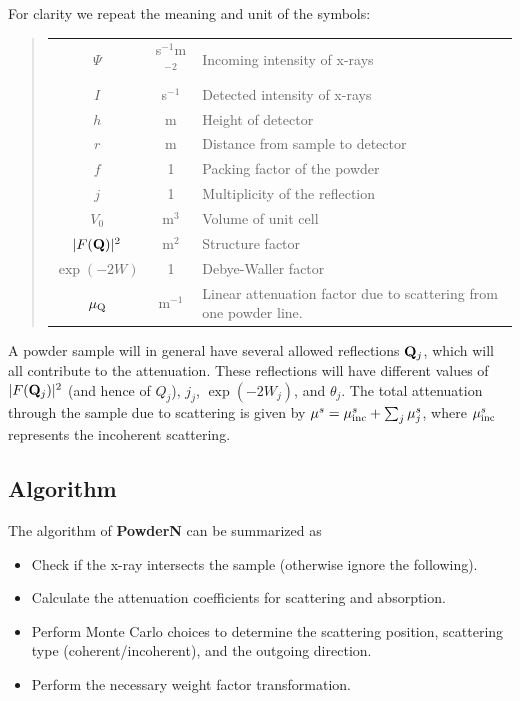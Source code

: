 For clarity we repeat the meaning and unit of the symbols:
%
\begin{quote}\begin{tabular}{ccl}
$\Psi$ & s$^{-1}$m$^{-2}$ & Incoming intensity of x-rays \\
$I$    & s$^{-1}$ & Detected intensity of x-rays \\
$h$    & m        & Height of detector \\
$r$    & m        & Distance from sample to detector \\
$f$    & 1        & Packing factor of the powder \\
$j$    & 1        & Multiplicity of the reflection \\
$V_0$  & m$^{3}$  & Volume of unit cell\\
$|F({\bf Q})|^2$ & m$^2$  & Structure factor \\
$\exp(-2W)$ & 1  & Debye-Waller factor \\
$\mu_{\rm Q}$ & m$^{-1}$ & Linear attenuation factor due to scattering from
one powder line. \\
\end{tabular}\end{quote}
%

A powder sample will in general have several allowed reflections
${\bf Q}_j$, which will all contribute to the attenuation.
These reflections will have different values of
$|F({\bf Q}_j)|^2$ (and hence of $Q_j$), $j_j$, $\exp(-2W_j)$,
and $\theta_j$.
The total attenuation through the sample due to scattering is given by
$\mu^s = \mu_{\rm inc}^s + \sum_j \mu^s_j $,
where $\mu_{\rm inc}^s$ represents the incoherent scattering.

\subsection{Algorithm}
The algorithm of {\bf PowderN} can be summarized as
\begin{itemize}
\item Check if the x-ray intersects the sample (otherwise ignore
the following).
\item Calculate the attenuation coefficients for scattering and absorption.
\item Perform Monte Carlo choices to determine the scattering position,
scattering type (coherent/incoherent), and the outgoing direction.
\item Perform the necessary weight factor transformation.
\end{itemize}

